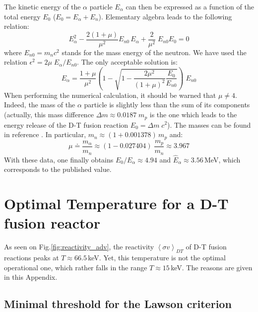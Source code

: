 The kinetic energy of the $\alpha$ particle $E_\alpha$ can then be expressed as a function of the total energy $E_0$ ($E_0 =E_\alpha + E_n$). Elementary algebra leads to the following relation:
\begin{equation}
    E_\alpha^2 - \frac{2(1+\mu)}{\mu^2}E_{n0}\, E_\alpha + \frac{2}{\mu^2}\; E_{n0}E_0 = 0
\end{equation}
where $E_{n0} = m_nc^2$ stands for the mass energy of the neutron. We have used the relation $\epsilon^2 = 2\mu\; E_\alpha/E_{n0}$. The only acceptable solution is:
\begin{equation}
    E_\alpha = \frac{1+\mu}{\mu^2}
    \left( 1 - \sqrt{1-\frac{2\mu^2}{(1+\mu)^2}\frac{E_0}{E_{n0}}}\right)\; E_{n0}
\end{equation}
When performing the numerical calculation, it should be warned that $\mu\neq 4$. 
Indeed, the mass of the $\alpha$ particle is slightly less than the sum of its components (actually, this mass difference $\Delta m \approx 0.0187\; m_p$ is the one which leads to the energy release of the D-T fusion reaction $E_0 = \Delta m\;c^2$). The masses can be found in reference . In particular, $m_n \approx (1+0.001378)\, m_p$ and:
$$
    \mu \doteq \frac{m_\alpha}{m_n} \approx (1-0.027404)\; \frac{m_p}{m_n} \approx 3.967
$$
With these data, one finally obtains $E_0/E_\alpha \approx 4.94$ and $\hat E_\alpha \approx 3.56\,$MeV, which corresponds to the published value.  

\chapter{Optimal Temperature for a D-T fusion reactor}
\label{appendix:temperature}

As seen on Fig.\ref{fig:reactivity_adv}, the reactivity $\left< \sigma v \right>_{DT}$ of D-T fusion reactions peaks at $T\approx 66.5\,$keV. Yet, this temperature is not the optimal operational one, which rather falls in the range $T\approx 15\,$keV. The reasons are given in this Appendix.


\section{Minimal threshold for the Lawson criterion}

